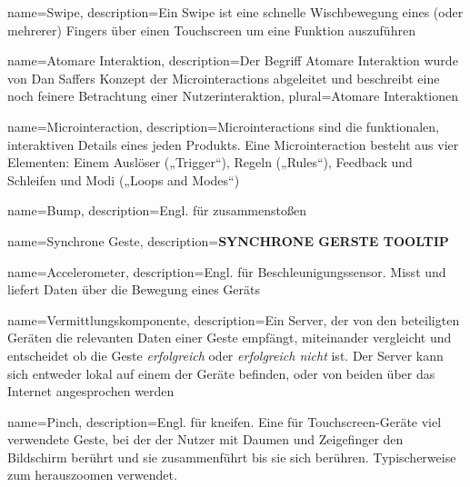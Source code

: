 {
    name=Swipe,
    description={Ein Swipe ist eine schnelle Wischbewegung eines (oder 				mehrerer) Fingers über einen Touchscreen um eine Funktion auszuführen}
}

{
    name=Atomare Interaktion,
    description={Der Begriff Atomare Interaktion wurde von Dan Saffers Konzept 		der Microinteractions abgeleitet und beschreibt eine noch feinere 				Betrachtung einer Nutzerinteraktion},
    plural={Atomare Interaktionen}
}

{
    name=Microinteraction,
    description={Microinteractions sind die funktionalen, interaktiven Details 		eines jeden Produkts. Eine Microinteraction besteht aus vier Elementen: 		Einem Auslöser („Trigger“), Regeln („Rules“), Feedback und Schleifen und 		Modi („Loops and Modes“)}
}

{
	name=Bump,
	description={Engl. für zusammenstoßen}
}

{
	name=Synchrone Geste,
	description={\textbf{SYNCHRONE GERSTE TOOLTIP}}
}

{
	name=Accelerometer,
	description={Engl. für Beschleunigungssensor. Misst und liefert Daten 			über die Bewegung eines Geräts}
}

{
	name=Vermittlungskomponente,
	description={Ein Server, der von den beteiligten Geräten die relevanten 		Daten einer Geste empfängt, miteinander vergleicht und entscheidet ob die 	Geste \textit{erfolgreich} oder \textit{erfolgreich nicht} ist. Der 			Server kann sich entweder lokal auf einem der Geräte befinden, oder von 		beiden über das Internet angesprochen werden}
}

{
	name=Pinch,
	description={Engl. für kneifen. Eine für Touchscreen-Geräte viel 				verwendete Geste, bei der der Nutzer mit Daumen und Zeigefinger den 			Bildschirm berührt und sie zusammenführt bis sie sich berühren. 				Typischerweise zum herauszoomen verwendet.}
}